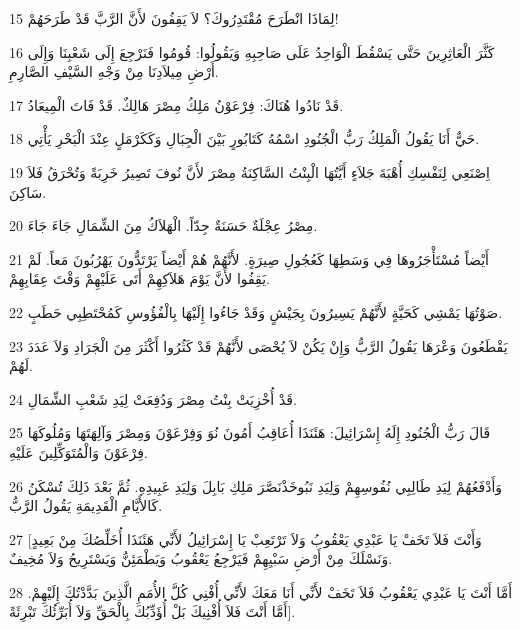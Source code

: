 \par 15 لِمَاذَا انْطَرَحَ مُقْتَدِرُوكَ؟ لاَ يَقِفُونَ لأَنَّ الرَّبَّ قَدْ طَرَحَهُمْ!
\par 16 كَثَّرَ الْعَاثِرِينَ حَتَّى يَسْقُطَ الْوَاحِدُ عَلَى صَاحِبِهِ وَيَقُولُوا: قُومُوا فَنَرْجِعَ إِلَى شَعْبِنَا وَإِلَى أَرْضِ مِيلاَدِنَا مِنْ وَجْهِ السَّيْفِ الصَّارِمِ.
\par 17 قَدْ نَادُوا هُنَاكَ: فِرْعَوْنُ مَلِكُ مِصْرَ هَالِكٌ. قَدْ فَاتَ الْمِيعَادُ.
\par 18 حَيٌّ أَنَا يَقُولُ الْمَلِكُ رَبُّ الْجُنُودِ اسْمُهُ كَتَابُورٍ بَيْنَ الْجِبَالِ وَكَكَرْمَلٍ عِنْدَ الْبَحْرِ يَأْتِي.
\par 19 اِصْنَعِي لِنَفْسِكِ أُهْبَةَ جَلاَءٍ أَيَّتُهَا الْبِنْتُ السَّاكِنَةُ مِصْرَ لأَنَّ نُوفَ تَصِيرُ خَرِبَةً وَتُحْرَقُ فَلاَ سَاكِنَ.
\par 20 مِصْرُ عِجْلَةٌ حَسَنَةٌ جِدّاً. الْهَلاَكُ مِنَ الشِّمَالِ جَاءَ جَاءَ.
\par 21 أَيْضاً مُسْتَأْجَرُوهَا فِي وَسَطِهَا كَعُجُولِ صِيرَةٍ. لأَنَّهُمْ هُمْ أَيْضاً يَرْتَدُّونَ يَهْرُبُونَ مَعاً. لَمْ يَقِفُوا لأَنَّ يَوْمَ هَلاَكِهِمْ أَتَى عَلَيْهِمْ وَقْتَ عِقَابِهِمْ.
\par 22 صَوْتُهَا يَمْشِي كَحَيَّةٍ لأَنَّهُمْ يَسِيرُونَ بِجَيْشٍ وَقَدْ جَاءُوا إِلَيْهَا بِالْفُؤُوسِ كَمُحْتَطِبِي حَطَبٍ.
\par 23 يَقْطَعُونَ وَعْرَهَا يَقُولُ الرَّبُّ وَإِنْ يَكُنْ لاَ يُحْصَى لأَنَّهُمْ قَدْ كَثُرُوا أَكْثَرَ مِنَ الْجَرَادِ وَلاَ عَدَدَ لَهُمْ.
\par 24 قَدْ أُخْزِيَتْ بِنْتُ مِصْرَ وَدُفِعَتْ لِيَدِ شَعْبِ الشِّمَالِ.
\par 25 قَالَ رَبُّ الْجُنُودِ إِلَهُ إِسْرَائِيلَ: هَئَنَذَا أُعَاقِبُ أَمُونَ نُوَ وَفِرْعَوْنَ وَمِصْرَ وَآلِهَتَهَا وَمُلُوكَهَا فِرْعَوْنَ وَالْمُتَوَكِّلِينَ عَلَيْهِ.
\par 26 وَأَدْفَعُهُمْ لِيَدِ طَالِبِي نُفُوسِهِمْ وَلِيَدِ نَبُوخَذْنَصَّرَ مَلِكِ بَابِلَ وَلِيَدِ عَبِيدِهِ. ثُمَّ بَعْدَ ذَلِكَ تُسْكَنُ كَالأَيَّامِ الْقَدِيمَةِ يَقُولُ الرَّبُّ.
\par 27 [وَأَنْتَ فَلاَ تَخَفْ يَا عَبْدِي يَعْقُوبُ وَلاَ تَرْتَعِبْ يَا إِسْرَائِيلُ لأَنِّي هَئَنَذَا أُخَلِّصُكَ مِنْ بَعِيدٍ وَنَسْلَكَ مِنْ أَرْضِ سَبْيِهِمْ فَيَرْجِعُ يَعْقُوبُ وَيَطْمَئِنُّ وَيَسْتَرِيحُ وَلاَ مُخِيفٌ.
\par 28 أَمَّا أَنْتَ يَا عَبْدِي يَعْقُوبُ فَلاَ تَخَفْ لأَنِّي أَنَا مَعَكَ لأَنِّي أُفْنِي كُلَّ الأُمَمِ الَّذِينَ بَدَّدْتُكَ إِلَيْهِمْ. أَمَّا أَنْتَ فَلاَ أُفْنِيكَ بَلْ أُؤَدِّبُكَ بِالْحَقِّ وَلاَ أُبَرِّئُكَ تَبْرِئَةً].

